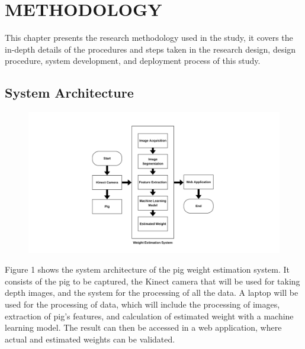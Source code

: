 \chapter{METHODOLOGY}
{\baselineskip
	
This chapter presents the research methodology used in the study, it covers the in-depth details of the procedures and steps taken in the research design, design procedure, system development, and deployment process of this study.


\section { System Architecture}

\begin{figure}[h]
	\centering
	\includegraphics[height=0.4\textheight]{figures/Architectureofniggas}
	\caption{}
	\label{fig:System Architecture}
\end{figure}

Figure 1 shows the system architecture of the pig weight estimation system. It consists of the pig to be captured, the Kinect camera that will be used for taking depth images, and the system for the processing of all the data. A laptop will be used for the processing of data, which will include the processing of images, extraction of pig’s features, and calculation of estimated weight with a machine learning model. The result can then be accessed in a web application, where actual and estimated weights can be validated.

}
